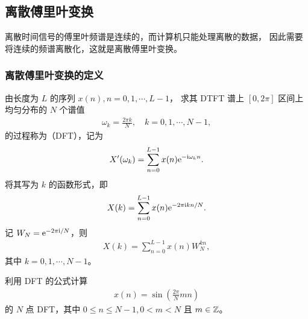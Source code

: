 \subsection{离散傅里叶变换}

离散时间信号的傅里叶频谱是连续的，而计算机只能处理离散的数据，
因此需要将连续的频谱离散化，这就是离散傅里叶变换。

\subsubsection{离散傅里叶变换的定义}

\begin{definition}
    由长度为 $L$ 的序列 $x(n), n = 0, 1, \cdots, L - 1$，
    求其 DTFT 谱上 $[0, 2\pi]$ 区间上均匀分布的 $N$ 个谱值
    \begin{align*}
        \omega_k = \frac{2\pi k}{N}, \quad k = 0, 1, \cdots, N - 1,
    \end{align*}
    的过程称为（DFT），记为
    \begin{align*}
        X'(\omega_k) = \sum_{n = 0}^{L - 1}x(n)\mathrm{e}^{-\mathrm{i}\omega_k n}.
    \end{align*}
    将其写为 $k$ 的函数形式，即
    \begin{align*}
        X(k) = \sum_{n = 0}^{L - 1}x(n)\mathrm{e}^{-2\pi\mathrm{i} k n/N}.
    \end{align*}
    记 $W_N = \mathrm{e}^{-2\pi\mathrm{i}/N}$，则
    \begin{align*}
        X(k) = \sum_{n = 0}^{L - 1}x(n)W_N^{kn},
    \end{align*}
    其中 $k = 0, 1, \cdots, N - 1$。
\end{definition}

\begin{exercise}
    利用 DFT 的公式计算
    \begin{align*}
        x(n) = \sin\left(\frac{2\pi}{N}mn\right)
    \end{align*}
    的 $N$ 点 DFT，其中 $0 \le n \le N - 1, 0 < m < N$ 且 $m \in \mathbb{Z}$。
\end{exercise}

